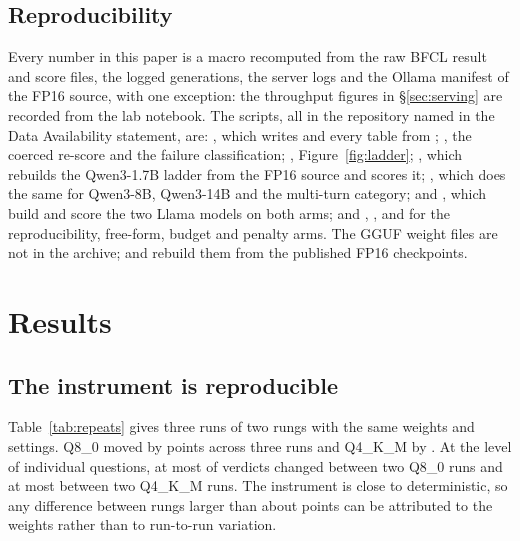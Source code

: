\documentclass[12pt,letterpaper]{article}
\newcommand{\bfcl}{BFCL}
\newcommand{\qm}{Qwen3-1.7B}
\begin{document}
\subsection{Reproducibility}
Every number in this paper is a macro recomputed from the raw \bfcl{} result and score files, the logged generations, the server logs and the Ollama manifest of the FP16 source, with one exception: the throughput figures in \S\ref{sec:serving} are recorded from the lab notebook. The scripts, all in the repository named in the Data Availability statement, are: , which writes  and every table from ; , the coerced re-score and the failure classification; , Figure~\ref{fig:ladder}; , which rebuilds the \qm{} ladder from the FP16 source and scores it; , which does the same for Qwen3-8B, Qwen3-14B and the multi-turn category;  and , which build and score the two Llama models on both arms; and , ,  and  for the reproducibility, free-form, budget and penalty arms. The GGUF weight files are not in the archive;  and  rebuild them from the published FP16 checkpoints.

\section{Results}

\subsection{The instrument is reproducible}
\label{sec:repro}

Table~\ref{tab:repeats} gives three runs of two rungs with the same weights and settings. Q8\_0 moved by \qtRepRangeEight{} points across three runs and Q4\_K\_M by \qtRepRangeFour{}. At the level of individual questions, at most \qtRepFlipsMaxEight{} of \qtN{} verdicts changed between two Q8\_0 runs and at most \qtRepFlipsMaxFour{} between two Q4\_K\_M runs. The instrument is close to deterministic, so any difference between rungs larger than about \qtMaxRepRange{} points can be attributed to the weights rather than to run-to-run variation.

\begin{table}[t]
\centering\footnotesize\setlength{\tabcolsep}{4pt}

\caption{Run-to-run variation with the same weights and settings, \qm{}, \texttt{simple\_python}, $n=\qtN{}$.}
\label{tab:repeats}
\end{table}
\end{document}
